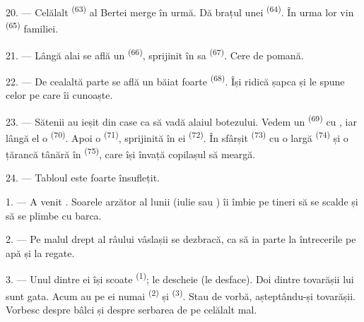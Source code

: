 20. --- Celălalt  \textsuperscript{(63)} al Bertei merge în urmă. Dă
brațul unei  \textsuperscript{(64)}. În urma lor vin
 \textsuperscript{(65)} familiei.

\VUsaut{4.6mm}
\VUsaut{3.4mm}

21. --- Lângă alai se află un  \textsuperscript{(66)}, sprijinit
în  sa \textsuperscript{(67)}. Cere de pomană.

22. --- De cealaltă parte se află un băiat foarte 
\textsuperscript{(68)}. Își ridică șapca și le spune  celor pe
care îi cunoaște.

23. --- Sătenii au ieșit din case ca să vadă alaiul botezului. Vedem un
 \textsuperscript{(69)} cu , iar lângă el
o  \textsuperscript{(70)}. Apoi o 
\textsuperscript{(71)}, sprijinită în  ei \textsuperscript{(72)}.
În sfârșit  \textsuperscript{(73)} cu o  largă \textsuperscript{(74)} și o țărancă tânără în 
\textsuperscript{(75)}, care își învață copilașul să meargă.

24. --- Tabloul este foarte însuflețit.
\VUsaut{4.0mm}

\VUsaut{3.0mm}

\VUsaut{2.4mm}

\VUsaut{3.0mm}

1. --- A venit . Soarele arzător al lunii  (iulie sau
) îi îmbie pe tineri să se scalde și să se plimbe cu barca.

2. --- Pe malul drept al râului vâslașii se dezbracă, ca să ia parte la întrecerile
pe apă și la regate.

3. --- Unul dintre ei își scoate  \textsuperscript{(1)}; le
descheie (le desface). Doi dintre tovarășii lui sunt gata. Acum au pe ei numai
 \textsuperscript{(2)} și  \textsuperscript{(3)}.
Stau de vorbă, așteptându-și tovarășii. Vorbesc despre bâlci și despre serbarea de
pe celălalt mal.

